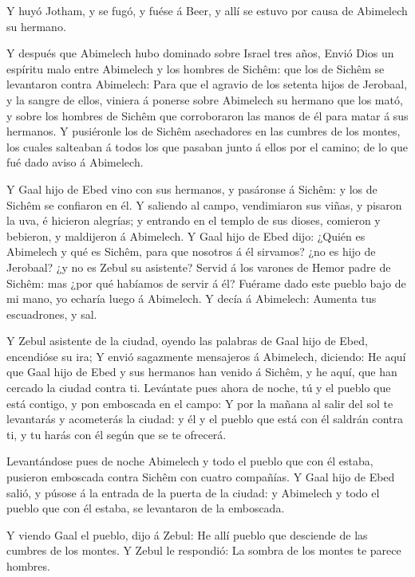  Y huyó Jotham, y se fugó, y fuése á Beer, y allí se estuvo
por causa de Abimelech su hermano.

 Y después que Abimelech hubo dominado sobre Israel tres
años,  Envió Dios un espíritu malo entre Abimelech y los
hombres de Sichêm: que los de Sichêm se levantaron contra Abimelech:
 Para que el agravio de los setenta hijos de Jerobaal, y la
sangre de ellos, viniera á ponerse sobre Abimelech su hermano que los
mató, y sobre los hombres de Sichêm que corroboraron las manos de él
para matar á sus hermanos.  Y pusiéronle los de Sichêm
asechadores en las cumbres de los montes, los cuales salteaban á todos
los que pasaban junto á ellos por el camino; de lo que fué dado aviso á
Abimelech.

 Y Gaal hijo de Ebed vino con sus hermanos, y pasáronse á
Sichêm: y los de Sichêm se confiaron en él.  Y saliendo al
campo, vendimiaron sus viñas, y pisaron la uva, é hicieron alegrías; y
entrando en el templo de sus dioses, comieron y bebieron, y maldijeron á
Abimelech.  Y Gaal hijo de Ebed dijo: ¿Quién es Abimelech y
qué es Sichêm, para que nosotros á él sirvamos? ¿no es hijo de Jerobaal?
¿y no es Zebul su asistente? Servid á los varones de Hemor padre de
Sichêm: mas ¿por qué habíamos de servir á él?  Fuérame dado
este pueblo bajo de mi mano, yo echaría luego á Abimelech. Y decía á
Abimelech: Aumenta tus escuadrones, y sal.

 Y Zebul asistente de la ciudad, oyendo las palabras de
Gaal hijo de Ebed, encendióse su ira;  Y envió sagazmente
mensajeros á Abimelech, diciendo: He aquí que Gaal hijo de Ebed y sus
hermanos han venido á Sichêm, y he aquí, que han cercado la ciudad
contra ti.  Levántate pues ahora de noche, tú y el pueblo
que está contigo, y pon emboscada en el campo:  Y por la
mañana al salir del sol te levantarás y acometerás la ciudad: y él y el
pueblo que está con él saldrán contra ti, y tu harás con él según que se
te ofrecerá.

 Levantándose pues de noche Abimelech y todo el pueblo que
con él estaba, pusieron emboscada contra Sichêm con cuatro compañías.
 Y Gaal hijo de Ebed salió, y púsose á la entrada de la
puerta de la ciudad: y Abimelech y todo el pueblo que con él estaba, se
levantaron de la emboscada.

 Y viendo Gaal el pueblo, dijo á Zebul: He allí pueblo que
desciende de las cumbres de los montes. Y Zebul le respondió: La sombra
de los montes te parece hombres.

